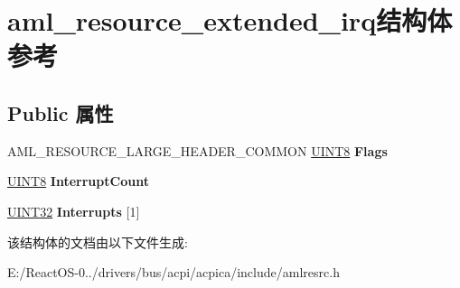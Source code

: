 \hypertarget{structaml__resource__extended__irq}{}\section{aml\+\_\+resource\+\_\+extended\+\_\+irq结构体 参考}
\label{structaml__resource__extended__irq}
\subsection*{Public 属性}
\begin{DoxyCompactItemize}
\item 
\mbox{\label{structaml__resource__extended__irq_a926f4fe86af7c7dee9355f694c876088}} 
A\+M\+L\+\_\+\+R\+E\+S\+O\+U\+R\+C\+E\+\_\+\+L\+A\+R\+G\+E\+\_\+\+H\+E\+A\+D\+E\+R\+\_\+\+C\+O\+M\+M\+ON \hyperlink{_processor_bind_8h_ab27e9918b538ce9d8ca692479b375b6a}{U\+I\+N\+T8} {\bfseries Flags}
\item 
\mbox{\label{structaml__resource__extended__irq_af532a47c3e9f1debacc9083cdbda51ac}} 
\hyperlink{_processor_bind_8h_ab27e9918b538ce9d8ca692479b375b6a}{U\+I\+N\+T8} {\bfseries Interrupt\+Count}
\item 
\mbox{\label{structaml__resource__extended__irq_af6c890fbeac02c837ebe0be685a22470}} 
\hyperlink{_processor_bind_8h_ae1e6edbbc26d6fbc71a90190d0266018}{U\+I\+N\+T32} {\bfseries Interrupts} \mbox{[}1\mbox{]}
\end{DoxyCompactItemize}


该结构体的文档由以下文件生成\+:\begin{DoxyCompactItemize}
\item 
E\+:/\+React\+O\+S-\/0../drivers/bus/acpi/acpica/include/amlresrc.\+h\end{DoxyCompactItemize}
